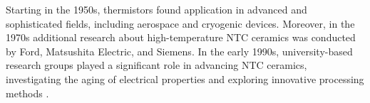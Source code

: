 Starting in the 1950s, thermistors found application in advanced and sophisticated fields, including aerospace and cryogenic devices. Moreover, in the 1970s additional research about high-temperature NTC ceramics was conducted by Ford, Matsushita Electric, and Siemens. In the early 1990s, university-based research groups played a significant role in advancing NTC ceramics, investigating the aging of electrical properties and exploring innovative processing methods \cite{Feteira2009967}\cite{Becker1947170}.

